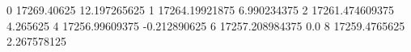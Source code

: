 0 17269.40625 12.197265625
1 17264.19921875 6.990234375
2 17261.474609375 4.265625
4 17256.99609375 -0.212890625
6 17257.208984375 0.0
8 17259.4765625 2.267578125
